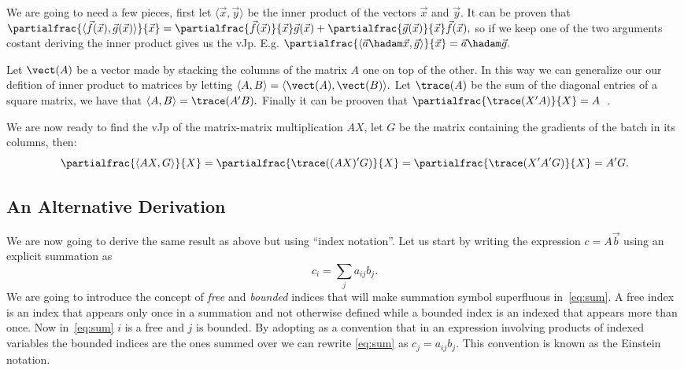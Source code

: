 \documentclass{article}
\begin{document}
We are going to need a few pieces, first let \(\langle\vec x,\vec y\rangle\) be
the inner product of the vectors \(\vec x\) and \(\vec y.\) It can be proven
that \(\partialfrac{\langle\vec f(\vec x),\vec g(\vec x)\rangle}{\vec x}
= \partialfrac{\vec f(\vec x)}{\vec x} \vec g(\vec x)
	+ \partialfrac{\vec g(\vec x)}{\vec x} \vec f(\vec x),\) so if we keep one
of the two arguments costant deriving the inner product gives us the vJp. E.g.
\(\partialfrac{\langle\vec a \hadam \vec x,\vec g\rangle}{\vec x}
= \vec a \hadam \vec g.\)

Let \(\vect(A)\) be a vector made by stacking the columns of the matrix \(A\)
one on top of the other. In this way we can generalize our our defition of
inner product to matrices by letting \(\langle A,B\rangle =
\langle\vect(A),\vect(B)\rangle.\) Let \(\trace(A)\) be the sum of the diagonal
entries of a square matrix, we have that \(\langle A,B\rangle = \trace(A'B).\)
Finally it can be prooven that \(\partialfrac{\trace(X'A)}{X} =
A\)~\cite{cookbook,magnus}.

We are now ready to find the vJp of the matrix-matrix multiplication \(A X\),
let \(G\) be the matrix containing the gradients of the batch in its columns,
then: \[
\partialfrac{\langle AX,G\rangle}{X}
= \partialfrac{\trace((AX)'G)}{X}
= \partialfrac{\trace(X'A'G)}{X}
= A'G.\]


\subsection{An Alternative Derivation}

We are now going to derive the same result as above but using ``index
notation''. Let us start by writing the expression \(c = A \vec b\) using an
explicit summation as
\begin{equation}
	c_i = \sum_j a_{ij} b_j. \label{eq:sum}
\end{equation}
We are going to introduce the concept of \emph{free} and \emph{bounded} indices
that will make summation symbol superfluous in~\ref{eq:sum}. A free index is an
index that appears only once in a summation and not otherwise defined while a
bounded index is an indexed that appears more than once. Now in~\ref{eq:sum}
\(i\) is a free and \(j\) is bounded. By adopting as a convention that in an
expression involving products of indexed variables the bounded indices are the
ones summed over we can rewrite \ref{eq:sum} as \(c_j = a_{ij} b_{j}\). This
convention is known as the Einstein notation.
\end{document}
